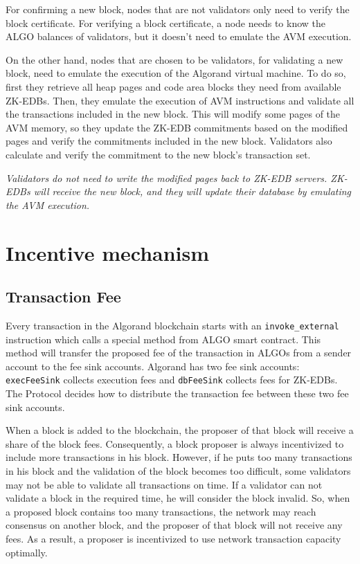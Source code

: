 \documentclass[11pt, A4]{article}
\begin{document}
    For confirming a new block, nodes that are not validators only need to verify the block certificate. For
    verifying a block certificate, a node needs to know the ALGO balances of validators, but it doesn't need to
    emulate the AVM execution.

    On the other hand, nodes that are chosen to be validators, for validating a new block, need to emulate the
    execution of the Algorand virtual machine. To do so, first they retrieve all heap pages and code area blocks they
    need from available ZK-EDBs. Then, they emulate the execution of AVM instructions and validate all the
    transactions included in the new block. This will modify some pages of the AVM memory, so they update the ZK-EDB
    commitments based on the modified pages and verify the commitments included in the new block. Validators also
    calculate and verify the commitment to the new block's transaction set.

    \emph{Validators do not need to write the modified pages back to ZK-EDB servers. ZK-EDBs will receive the new
    block, and they will update their database by emulating the AVM execution.}


    \section{Incentive mechanism}\label{incentive-mechanism}

    \subsection{Transaction Fee}\label{subsec:transaction-fee}

    Every transaction in the Algorand blockchain starts with an \texttt{invoke\_external} instruction which calls a
    special method from ALGO smart contract. This method will transfer the proposed fee of the transaction in ALGOs
    from a sender account to the fee sink accounts. Algorand has two fee sink accounts: \texttt{execFeeSink} collects
    execution fees and \texttt{dbFeeSink} collects fees for ZK-EDBs. The Protocol decides how to distribute the
    transaction fee between these two fee sink accounts.

    When a block is added to the blockchain, the proposer of that block will receive a share of the block fees.
    Consequently, a block proposer is always incentivized to include more transactions in his block. However, if he
    puts too many transactions in his block and the validation of the block becomes too difficult, some validators
    may not be able to validate all transactions on time. If a validator can not validate a block in the required
    time, he will consider the block invalid. So, when a proposed block contains too many transactions, the network
    may reach consensus on another block, and the proposer of that block will not receive any fees. As a result, a
    proposer is incentivized to use network transaction capacity optimally.
\end{document}
